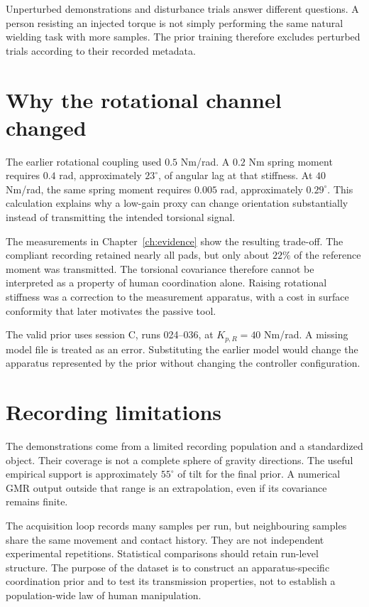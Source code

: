 Unperturbed demonstrations and disturbance trials answer different questions. A person resisting an injected torque is not simply performing the same natural wielding task with more samples. The prior training therefore excludes perturbed trials according to their recorded metadata.

\section{Why the rotational channel changed}

The earlier rotational coupling used $0.5$ Nm/rad. A $0.2$ Nm spring moment requires $0.4$ rad, approximately $23^\circ$, of angular lag at that stiffness. At $40$ Nm/rad, the same spring moment requires $0.005$ rad, approximately $0.29^\circ$. This calculation explains why a low-gain proxy can change orientation substantially instead of transmitting the intended torsional signal.

The measurements in Chapter~\ref{ch:evidence} show the resulting trade-off. The compliant recording retained nearly all pads, but only about $22\%$ of the reference moment was transmitted. The torsional covariance therefore cannot be interpreted as a property of human coordination alone. Raising rotational stiffness was a correction to the measurement apparatus, with a cost in surface conformity that later motivates the passive tool.

The valid prior uses session C, runs 024--036, at $K_{p,R}=40$ Nm/rad. A missing model file is treated as an error. Substituting the earlier model would change the apparatus represented by the prior without changing the controller configuration.

\section{Recording limitations}

The demonstrations come from a limited recording population and a standardized object. Their coverage is not a complete sphere of gravity directions. The useful empirical support is approximately $55^\circ$ of tilt for the final prior. A numerical GMR output outside that range is an extrapolation, even if its covariance remains finite.

The acquisition loop records many samples per run, but neighbouring samples share the same movement and contact history. They are not independent experimental repetitions. Statistical comparisons should retain run-level structure. The purpose of the dataset is to construct an apparatus-specific coordination prior and to test its transmission properties, not to establish a population-wide law of human manipulation.

